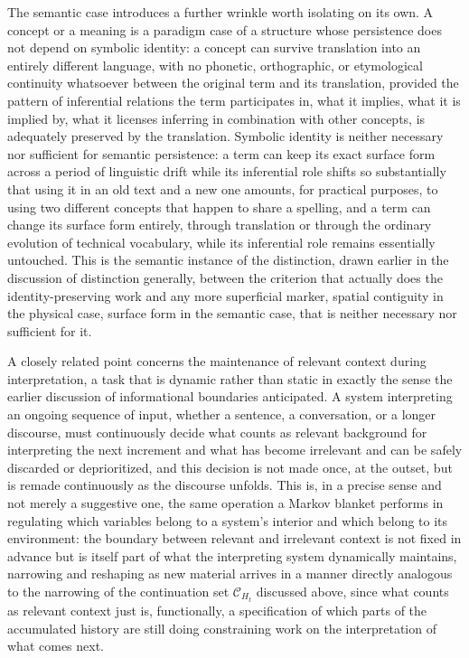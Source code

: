 \documentclass[11pt]{article}
\begin{document}
The semantic case introduces a further wrinkle worth isolating on its own. A concept or a meaning is a paradigm case of a structure whose persistence does not depend on symbolic identity: a concept can survive translation into an entirely different language, with no phonetic, orthographic, or etymological continuity whatsoever between the original term and its translation, provided the pattern of inferential relations the term participates in, what it implies, what it is implied by, what it licenses inferring in combination with other concepts, is adequately preserved by the translation. Symbolic identity is neither necessary nor sufficient for semantic persistence: a term can keep its exact surface form across a period of linguistic drift while its inferential role shifts so substantially that using it in an old text and a new one amounts, for practical purposes, to using two different concepts that happen to share a spelling, and a term can change its surface form entirely, through translation or through the ordinary evolution of technical vocabulary, while its inferential role remains essentially untouched. This is the semantic instance of the distinction, drawn earlier in the discussion of distinction generally, between the criterion that actually does the identity-preserving work and any more superficial marker, spatial contiguity in the physical case, surface form in the semantic case, that is neither necessary nor sufficient for it.

A closely related point concerns the maintenance of relevant context during interpretation, a task that is dynamic rather than static in exactly the sense the earlier discussion of informational boundaries anticipated. A system interpreting an ongoing sequence of input, whether a sentence, a conversation, or a longer discourse, must continuously decide what counts as relevant background for interpreting the next increment and what has become irrelevant and can be safely discarded or deprioritized, and this decision is not made once, at the outset, but is remade continuously as the discourse unfolds. This is, in a precise sense and not merely a suggestive one, the same operation a Markov blanket performs in regulating which variables belong to a system's interior and which belong to its environment: the boundary between relevant and irrelevant context is not fixed in advance but is itself part of what the interpreting system dynamically maintains, narrowing and reshaping as new material arrives in a manner directly analogous to the narrowing of the continuation set $\mathcal{C}_{H_t}$ discussed above, since what counts as relevant context just is, functionally, a specification of which parts of the accumulated history are still doing constraining work on the interpretation of what comes next.
\end{document}
